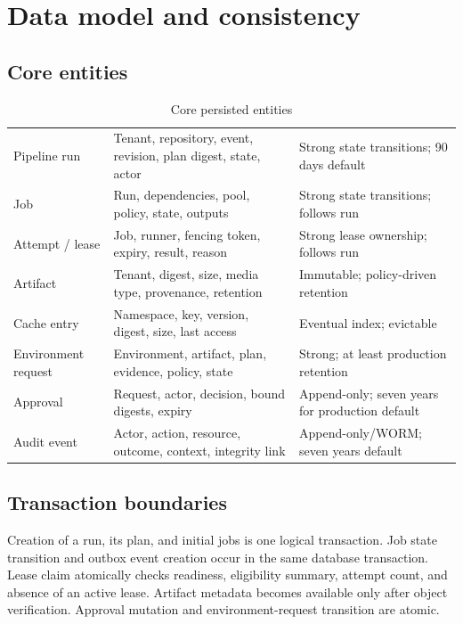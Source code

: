 \section{Data model and consistency}

\subsection{Core entities}

\begin{table}[htbp]
\centering
\caption{Core persisted entities}
\label{tab:data-model}
\begin{tabularx}{\textwidth}{@{}L{0.22\textwidth}Y Y@{}}
  \toprule
   &  &  \\
  \midrule
  Pipeline run & Tenant, repository, event, revision, plan digest, state, actor & Strong state transitions; 90 days default \\
  Job & Run, dependencies, pool, policy, state, outputs & Strong state transitions; follows run \\
  Attempt / lease & Job, runner, fencing token, expiry, result, reason & Strong lease ownership; follows run \\
  Artifact & Tenant, digest, size, media type, provenance, retention & Immutable; policy-driven retention \\
  Cache entry & Namespace, key, version, digest, size, last access & Eventual index; evictable \\
  Environment request & Environment, artifact, plan, evidence, policy, state & Strong; at least production retention \\
  Approval & Request, actor, decision, bound digests, expiry & Append-only; seven years for production default \\
  Audit event & Actor, action, resource, outcome, context, integrity link & Append-only/WORM; seven years default \\
  \bottomrule
\end{tabularx}
\end{table}

\subsection{Transaction boundaries}

Creation of a run, its plan, and initial jobs is one logical transaction. Job state
transition and outbox event creation occur in the same database transaction. Lease
claim atomically checks readiness, eligibility summary, attempt count, and absence of
an active lease. Artifact metadata becomes available only after object verification.
Approval mutation and environment-request transition are atomic.

